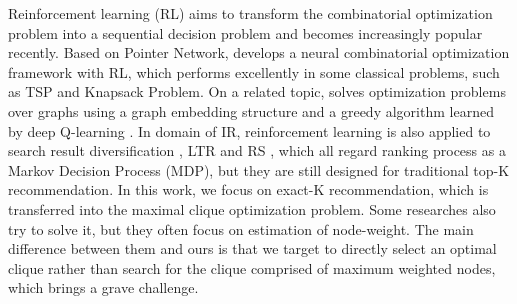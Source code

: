 Reinforcement learning (RL) \cite{silver2016mastering} aims to transform the combinatorial optimization problem into a sequential decision problem
and becomes increasingly popular recently.
Based on Pointer Network, \cite{bello2016neural} develops a neural combinatorial optimization framework with RL, which performs excellently in some classical problems, such as TSP and Knapsack Problem.
On a related topic, \cite{khalil2017learning} solves optimization problems over graphs using a graph embedding structure and a greedy algorithm learned by deep Q-learning \cite{mnih2013playing}.
In domain of IR, reinforcement learning is also applied to search result diversification \cite{xia2017adapting}, LTR \cite{hu2018reinforcement,wei2017reinforcement} and RS \cite{zhao2018deep,chen2018top,zheng2018drn},
which all regard ranking process as a Markov Decision Process (MDP),
but they are still designed for traditional top-K recommendation.
In this work, we focus on exact-K recommendation,
which is transferred into the maximal clique optimization problem.
Some researches \cite{Ion2011Image} also try to solve it,
but they often focus on estimation of node-weight.
The main difference between them and ours is that we target to directly select an optimal clique rather than search for the clique comprised of maximum weighted nodes, which brings a grave challenge.